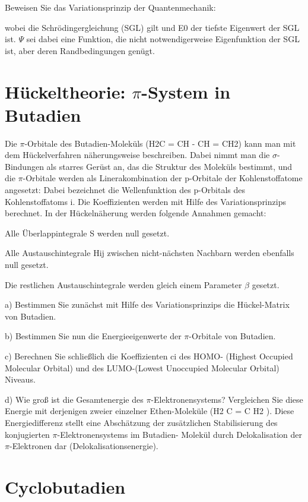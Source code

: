 Beweisen Sie das Variationsprinzip der Quantenmechanik:

 wobei die Schrödingergleichung (SGL) %
 gilt und E0 der tiefste Eigenwert der SGL ist. $\Psi$ sei dabei eine Funktion, die nicht notwendigerweise Eigenfunktion der SGL ist, aber deren Randbedingungen genügt.
 
 
\section{Hückeltheorie: $\pi$-System in Butadien}

Die $\pi$-Orbitale des Butadien-Moleküls (H2C = CH - CH = CH2) kann man mit dem Hückelverfahren näherungsweise beschreiben. Dabei nimmt man die $\sigma$-Bindungen als starres Gerüst an, das die Struktur des Moleküls bestimmt, und die $\pi$-Orbitale werden als Linerakombination der p-Orbitale der Kohlenstoffatome angesetzt:
 Dabei bezeichnet %
  die Wellenfunktion des p-Orbitals des Kohlenstoffatoms i. Die Koeffizienten
werden mit Hilfe des Variationsprinzips berechnet.
In der Hückelnäherung werden folgende Annahmen gemacht:

Alle Überlappintegrale S werden null gesetzt.


Alle Austauschintegrale Hij zwischen nicht-nächsten Nachbarn werden ebenfalls null gesetzt.

 Die restlichen Austauschintegrale werden gleich einem Parameter $\beta$ gesetzt.
 
a) Bestimmen Sie zunächst mit Hilfe des Variationsprinzips die Hückel-Matrix von Butadien.

b) Bestimmen Sie nun die Energieeigenwerte der $\pi$-Orbitale von Butadien.

c) Berechnen Sie schließlich die Koeffizienten ci des HOMO- (Highest Occupied Molecular Orbital) und des LUMO-(Lowest Unoccupied Molecular Orbital) Niveaus.

d) Wie groß ist die Gesamtenergie des $\pi$-Elektronensystems? Vergleichen Sie diese Energie mit derjenigen zweier einzelner Ethen-Moleküle (H2 C = C H2 ). Diese Energiedifferenz stellt eine Abschätzung der zusätzlichen Stabilisierung des konjugierten $\pi$-Elektronensystems im Butadien- Molekül durch Delokalisation der $\pi$-Elektronen dar (Delokalisationsenergie).



\section{Cyclobutadien}

